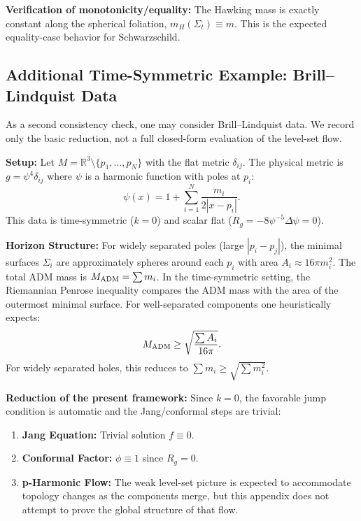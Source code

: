 \textbf{Verification of monotonicity/equality:} The Hawking mass is exactly constant along the spherical foliation, $m_H(\Sigma_t) \equiv m$. This is the expected equality-case behavior for Schwarzschild.

\subsection{Additional Time-Symmetric Example: Brill--Lindquist Data}
\label{app:BrillLindquist}

As a second consistency check, one may consider Brill--Lindquist data. We record only the basic reduction, not a full closed-form evaluation of the level-set flow.

\textbf{Setup:}
Let $M = \mathbb{R}^3 \setminus \{p_1, \dots, p_N\}$ with the flat metric $\delta_{ij}$. The physical metric is $g = \psi^4 \delta_{ij}$ where $\psi$ is a harmonic function with poles at $p_i$:
\begin{equation}
    \psi(x) = 1 + \sum_{i=1}^N \frac{m_i}{2|x - p_i|}.
\end{equation}
This data is time-symmetric ($k=0$) and scalar flat ($R_g = -8\psi^{-5}\Delta \psi = 0$).

\textbf{Horizon Structure:}
For widely separated poles (large $|p_i - p_j|$), the minimal surfaces $\Sigma_i$ are approximately spheres around each $p_i$ with area $A_i \approx 16\pi m_i^2$. The total ADM mass is $M_{\mathrm{ADM}} = \sum m_i$.
In the time-symmetric setting, the Riemannian Penrose inequality compares the ADM mass with the area of the outermost minimal surface. For well-separated components one heuristically expects:
\begin{equation}
    M_{\mathrm{ADM}} \ge \sqrt{\frac{\sum A_i}{16\pi}}.
\end{equation}
For widely separated holes, this reduces to $\sum m_i \ge \sqrt{\sum m_i^2}$.

\textbf{Reduction of the present framework:}
Since $k=0$, the favorable jump condition is automatic and the Jang/conformal steps are trivial:
\begin{enumerate}
    \item \textbf{Jang Equation:} Trivial solution $f \equiv 0$.
    \item \textbf{Conformal Factor:} $\phi \equiv 1$ since $R_g = 0$.
    \item \textbf{p-Harmonic Flow:} The weak level-set picture is expected to accommodate topology changes as the components merge, but this appendix does not attempt to prove the global structure of that flow.
\end{enumerate}

